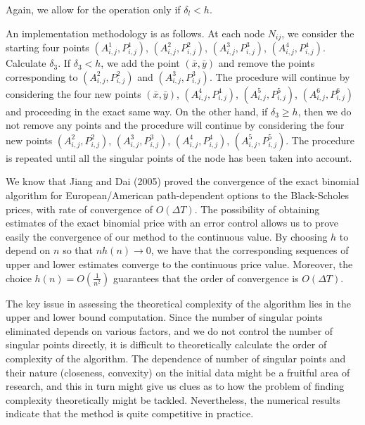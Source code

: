 Again, we allow for the operation only if $ \delta_l < h $.

An implementation methodology is as follows. At each node $ N_{ij} $, we consider the starting four points $ \left( A_{i,j}^1, P_{i,j}^1 \right) $, $ \left( A_{i,j}^2, P_{i,j}^2 \right) $, $ \left( A_{i,j}^3, P_{i,j}^3 \right) $, $ \left( A_{i,j}^4, P_{i,j}^4 \right) $. Calculate $ \delta_3 $. If $ \delta_3 < h $, we add the point $ (\bar{x}, \bar{y}) $ and remove the points corresponding to $ \left( A_{i,j}^2, P_{i,j}^2 \right) $ and $ \left( A_{i,j}^3, P_{i,j}^3 \right) $. The procedure will continue by considering the four new points $ (\bar{x}, \bar{y}) $, $ \left( A_{i,j}^4, P_{i,j}^4 \right) $, $ \left( A_{i,j}^5, P_{i,j}^5 \right) $, $ \left( A_{i,j}^6, P_{i,j}^6 \right) $ and proceeding in the exact same way. On the other hand, if $ \delta_3 \ge h $, then we do not remove any points and the procedure will continue by considering the four new points $ \left( A_{i,j}^2, P_{i,j}^2 \right) $, $ \left( A_{i,j}^3, P_{i,j}^3 \right) $, $ \left( A_{i,j}^4, P_{i,j}^4 \right) $, $ \left( A_{i,j}^5, P_{i,j}^5 \right) $. The procedure is repeated until all the singular points of the node has been taken into account.

\begin{rem}[Convergence]
	We know that Jiang and Dai (2005) \cite{Jiang2004} proved the convergence of the exact binomial algorithm for European/American path-dependent options to the Black-Scholes prices, with rate of convergence of $ O( \Delta T ) $. The possibility of obtaining estimates of the exact binomial price with an error control allows us to prove easily the convergence of our method to the continuous value. By choosing $ h $ to depend on $ n $ so that $ n h(n) \to 0 $, we have that the corresponding sequences of upper and lower estimates converge to the continuous price value. Moreover, the choice $ h(n) = O(\frac{1}{n^2}) $ guarantees that the order of convergence is $ O( \Delta T ) $.
\end{rem}

\begin{rem}
	The key issue in assessing the theoretical complexity of the algorithm lies in the upper and lower bound computation. Since the number of singular points eliminated depends on various factors, and we do not control the number of singular points directly, it is difficult to theoretically calculate the order of complexity of the algorithm. The dependence of number of singular points and their nature (closeness, convexity) on the initial data might be a fruitful area of research, and this in turn might give us clues as to how the problem of finding complexity theoretically might be tackled. Nevertheless, the numerical results indicate that the method is quite competitive in practice.
\end{rem}




